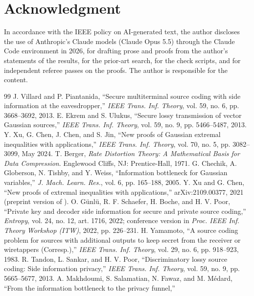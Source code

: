 \documentclass[11pt,onecolumn]{IEEEtran}
\begin{document}
\section*{Acknowledgment}

In accordance with the IEEE policy on AI-generated text, the author
discloses the use of Anthropic's Claude models (Claude Opus 5.5) through
the Claude Code environment in 2026, for drafting prose and proofs from
the author's statements of the results, for the prior-art search, for
the check scripts, and for independent referee passes on the proofs. The
author is responsible for the content.

\begin{thebibliography}{99}
 J. Villard and P. Piantanida, ``Secure multiterminal
source coding with side information at the eavesdropper,'' \emph{IEEE
Trans. Inf. Theory}, vol. 59, no. 6, pp. 3668--3692, 2013.
 E. Ekrem and S. Ulukus, ``Secure lossy transmission of
vector Gaussian sources,'' \emph{IEEE Trans. Inf. Theory}, vol. 59, no. 9,
pp. 5466--5487, 2013.
 Y. Xu, G. Chen, J. Chen, and S. Jin, ``New proofs of
Gaussian extremal inequalities with applications,'' \emph{IEEE Trans.
Inf. Theory}, vol. 70, no. 5, pp. 3082--3099, May 2024.
 T. Berger, \emph{Rate Distortion Theory: A Mathematical
Basis for Data Compression}. Englewood Cliffs, NJ: Prentice-Hall, 1971.
 G. Chechik, A. Globerson, N. Tishby, and Y. Weiss,
``Information bottleneck for Gaussian variables,'' \emph{J. Mach. Learn.
Res.}, vol. 6, pp. 165--188, 2005.
 Y. Xu and G. Chen, ``New proofs of extremal
inequalities with applications,'' arXiv:2109.00377, 2021 (preprint
version of \cite{xu2024}).
 O. G\"unl\"u, R. F. Schaefer, H. Boche, and H. V. Poor,
``Private key and decoder side information for secure and private source
coding,'' \emph{Entropy}, vol. 24, no. 12, art. 1716, 2022;
conference version in \emph{Proc. IEEE Inf. Theory Workshop (ITW)}, 2022,
pp. 226--231.
 H. Yamamoto, ``A source coding problem for sources
with additional outputs to keep secret from the receiver or wiretappers
(Corresp.),'' \emph{IEEE Trans. Inf. Theory}, vol. 29, no. 6, pp. 918--923,
1983.
 R. Tandon, L. Sankar, and H. V. Poor,
``Discriminatory lossy source coding: Side information privacy,''
\emph{IEEE Trans. Inf. Theory}, vol. 59, no. 9, pp. 5665--5677, 2013.
 A. Makhdoumi, S. Salamatian, N. Fawaz, and
M. M\'edard, ``From the information bottleneck to the privacy funnel,''

\end{thebibliography}
\end{document}
